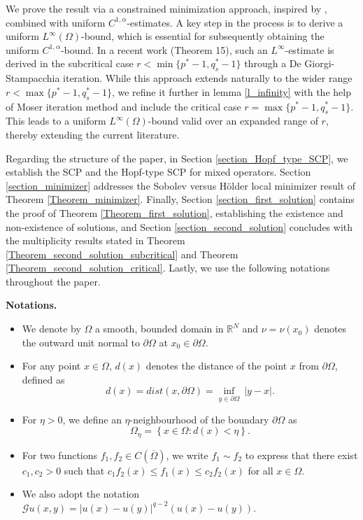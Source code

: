 \documentclass[reqno,oneside]{amsart}
\theoremstyle{definition}
\theoremstyle{remark}
\numberwithin{equation}{section}
\newcommand{\Om} {\Omega}
\newcommand{\sr}{\mathbb{R}}
\newcommand{\pa}{\partial}
\newcommand{\omc}{(\overline{\Om})}
\begin{document}
We prove the result via a constrained minimization approach, inspired by \cite{brock2008multiplicity}, combined with uniform $C^{1,\alpha}$-estimates. A key step in the process is to derive a uniform $L^{\infty}(\Om)$-bound, which is essential for subsequently obtaining the uniform $C^{1,\alpha}$-bound. In a recent work \cite{dhanya2026regularity} (Theorem 15), such an $L^{\infty}$-estimate is derived in the subcritical case $r < \min \{ p^* -1, q_s^* -1 \}$ through a De Giorgi-Stampacchia iteration. While this approach extends naturally to the wider range $r < \max \{ p^* -1, q_s^* -1 \}$, we refine it further in lemma \ref{l_infinity} with the help of Moser iteration method and include the critical case $r= \max \{ p^* -1, q_s^* -1 \}$. This leads to a uniform $L^{\infty}(\Om)$-bound valid over an expanded range of $r$, thereby extending the current literature.

Regarding the structure of the paper, in Section \ref{section_Hopf_type_SCP}, we establish the SCP and the Hopf-type SCP for mixed operators. Section \ref{section_minimizer} addresses the Sobolev versus H\"older local minimizer result of Theorem \ref{Theorem_minimizer}. Finally, Section \ref{section_first_solution} contains the proof of Theorem \ref{Theorem_first_solution}, establishing the existence and non-existence of solutions, and Section \ref{section_second_solution} concludes with the multiplicity results stated in Theorem \ref{Theorem_second_solution_subcritical} and Theorem \ref{Theorem_second_solution_critical}. Lastly, we use the following notations throughout the paper.
\vspace{5pt}

\textbf{Notations.}

\begin{itemize}

    \item We denote by $\Om$ a smooth, bounded domain in $\sr^N$ and $\nu = \nu (x_0)$ denotes the outward unit normal to $\pa\Om$ at $x_0 \in \pa\Om$.
    
    \item For any point $x\in\Om$, $d(x)$ denotes the distance of the point $x$ from $\pa\Om$, defined as
    \[d(x)= dist (x, \pa\Om) = \inf_{y\in\pa\Om}\ |y-x|.\]

    \item For $\eta>0$, we define an $\eta$-neighbourhood of the boundary $\pa\Om$ as
    \[\Om_{\eta} = \left\{ x\in \Om: d(x) < \eta \right\}.\]

    \item For two functions $f_1, f_2 \in C\omc$, we write $f_1\sim f_2$ to express that there exist $c_1, c_2 >0$ such that $c_1 f_2(x) \leq f_1(x) \leq c_2 f_2(x)$ for all $x\in\Om$.

    \item We also adopt the notation $\mathcal{G}u(x,y) = |u(x)-u(y)|^{q-2} \left( u(x) - u(y) \right)$.
\end{itemize}
\end{document}
